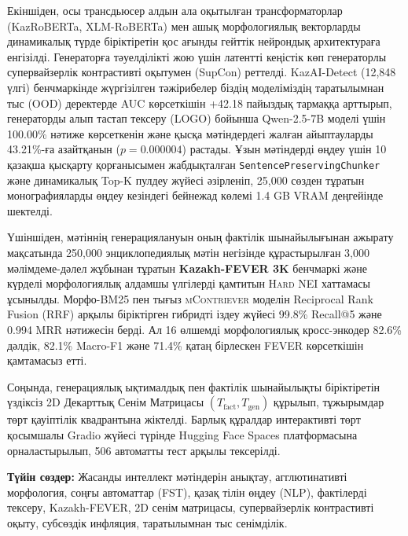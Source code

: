 Екіншіден, осы трансдьюсер алдын ала оқытылған трансформаторлар (KazRoBERTa, XLM-RoBERTa) мен ашық морфологиялық векторларды динамикалық түрде біріктіретін қос ағынды гейттік нейрондық архитектураға енгізілді. Генераторға тәуелділікті жою үшін латентті кеңістік көп генераторлы супервайзерлік контрастивті оқытумен (SupCon) реттелді. KazAI-Detect (12,848 үлгі) бенчмаркінде жүргізілген тәжірибелер біздің моделіміздің таратылымнан тыс (OOD) деректерде AUC көрсеткішін +42.18 пайыздық тармаққа арттырып, генераторды алып тастап тексеру (LOGO) бойынша Qwen-2.5-7B моделі үшін 100.00\% нәтиже көрсеткенін және қысқа мәтіндердегі жалған айыптауларды 43.21\%-ға азайтқанын ($p = 0.000004$) растады. Ұзын мәтіндерді өңдеу үшін 10 қазақша қысқарту қорғанысымен жабдықталған \texttt{SentencePreservingChunker} және динамикалық Top-K пулдеу жүйесі әзірленіп, 25,000 сөзден тұратын монографияларды өңдеу кезіндегі бейнежад көлемі 1.4 GB VRAM деңгейінде шектелді.

Үшіншіден, мәтіннің генерациялануын оның фактілік шынайылығынан ажырату мақсатында 250,000 энциклопедиялық мәтін негізінде құрастырылған 3,000 мәлімдеме-дәлел жұбынан тұратын \textbf{Kazakh-FEVER 3K} бенчмаркі және күрделі морфологиялық алдамшы үлгілерді қамтитын \textsc{Hard NEI} хаттамасы ұсынылды. Морфо-BM25 пен тығыз \textsc{mContriever} моделін Reciprocal Rank Fusion (RRF) арқылы біріктірген гибридті іздеу жүйесі 99.8\% Recall@5 және 0.994 MRR нәтижесін берді. Ал 16 өлшемді морфологиялық кросс-энкодер 82.6\% дәлдік, 82.1\% Macro-F1 және 71.4\% қатаң бірлескен FEVER көрсеткішін қамтамасыз етті.

Соңында, генерациялық ықтималдық пен фактілік шынайылықты біріктіретін үздіксіз 2D Декарттық Сенім Матрицасы $(T_{\text{fact}}, T_{\text{gen}})$ құрылып, тұжырымдар төрт қауіптілік квадрантына жіктелді. Барлық құралдар интерактивті төрт қосымшалы Gradio жүйесі түрінде Hugging Face Spaces платформасына орналастырылып, 506 автоматты тест арқылы тексерілді.

\vspace{0.8em}
\noindent\textbf{Түйін сөздер:} Жасанды интеллект мәтіндерін анықтау, агглютинативті морфология, соңғы автоматтар (FST), қазақ тілін өңдеу (NLP), фактілерді тексеру, Kazakh-FEVER, 2D сенім матрицасы, супервайзерлік контрастивті оқыту, субсөздік инфляция, таратылымнан тыс сенімділік.

\clearpage

